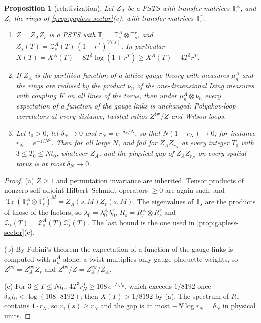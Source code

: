 \documentclass[11pt,a4paper]{amsart}
\newtheorem{proposition}[theorem]{Proposition}
\theoremstyle{definition}
\theoremstyle{remark}
\numberwithin{equation}{section}
\DeclareMathOperator{\Tr}{Tr}        %
\newcommand{\PSTS}{\textup{PSTS}}          %
\newcommand{\TT}{\mathbb{T}}               %
\newcommand{\Zc}{\mathcal{Z}}              %
\newcommand{\Zs}[2]{\Zc_{#1}(#2)}          %
\newcommand{\Vol}[1]{V(#1)}                %
\newcommand{\lzero}{\lambda_0}             %
\newcommand{\xconst}{\frac{1}{8192}}       %
\newcommand{\xconstinl}{1/8192}            %
\newcommand{\Mcirc}{\text{\upshape(M$^{\circ}$)}}   %
\newcommand{\Bcirc}{\text{\upshape(B$^{\circ}$)}}   %
\newcommand{\tzero}{t_0}                   %
\begin{document}
\begin{proposition}[relativization]\label{prop:relativization}
Let $Z_A$ be a \PSTS{} with transfer matrices $\TT^A_s$, and $Z_r$ the rings of \cref{prop:gapless-sector}(c), with transfer matrices $\TT^r_s$.
\begin{enumerate}[label=\textup{(\alph*)},leftmargin=*]
\item $Z=Z_AZ_r$ is a \PSTS{} with $\TT_s=\TT^A_s\otimes\TT^r_s$, and $\Zs{s}{T}=\Zc^A_s(T)\,(1+r^T)^{\Vol{s}}$. In particular $X(T)=X^A(T)+8T^3\log(1+r^T)\ge X^A(T)+4T^3r^T$.
\item If $Z_A$ is the partition function of a lattice gauge theory with measures $\mu^A_n$ and the rings are realised by the product $\nu_n$ of the one-dimensional Ising measures with coupling $K$ on all lines of the torus, then under $\mu^A_n\otimes\nu_n$ every expectation of a function of the gauge links is unchanged: Polyakov-loop correlators at every distance, twisted ratios $Z^{\mathrm{tw}}/Z$ and Wilson loops.
\item Let $\tzero>0$, let $\delta_N\to0$ and $r_N=e^{-\delta_N/N}$, so that $N(1-r_N)\to0$; for instance $r_N=e^{-1/N^2}$. Then for all large $N$, \Bcirc{} and \Mcirc{} fail for $Z_AZ_{r_N}$ at every integer $T_0$ with $3\le T_0\le N\tzero$, whatever $Z_A$, and the physical gap of $Z_AZ_{r_N}$ on every spatial torus is at most $\delta_N\to0$.
\end{enumerate}
\end{proposition}

\begin{proof}
(a) $Z\ge1$ and permutation invariance are inherited. Tensor products of nonzero self-adjoint Hilbert--Schmidt operators $\ge0$ are again such, and $\Tr(\TT^A_s\otimes\TT^r_s)^M=Z_A(s,M)Z_r(s,M)$. The eigenvalues of $\TT_s$ are the products of those of the factors, so $\lzero=\lzero^A\lzero^r$, $R_s=R^A_s\otimes R^r_s$ and $\Zs{s}{T}=\Zc^A_s(T)\Zc^r_s(T)$. The last bound is the one used in \cref{prop:gapless-sector}(c).

(b) By Fubini's theorem the expectation of a function of the gauge links is computed with $\mu^A_n$ alone; a twist multiplies only gauge-plaquette weights, so $Z^{\mathrm{tw}}=Z^{\mathrm{tw}}_AZ_r$ and $Z^{\mathrm{tw}}/Z=Z^{\mathrm{tw}}_A/Z_A$.

(c) For $3\le T\le N\tzero$, $4T^3r_N^T\ge108\,e^{-\delta_N\tzero}$, which exceeds $\xconstinl$ once $\delta_N\tzero<\log(108\cdot8192)$; then $X(T)>\xconstinl$ by (a). The spectrum of $R_s$ contains $1\cdot r_N$, so $r_1(s)\ge r_N$ and the gap is at most $-N\log r_N=\delta_N$ in physical units.
\end{proof}
\end{document}
